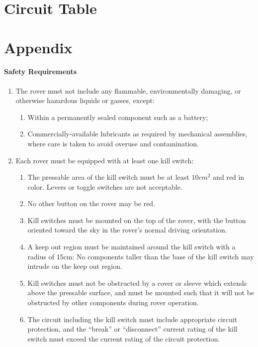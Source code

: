 \section{Circuit Table}

\section{Appendix}

\paragraph{Safety Requirements}

\begin{enumerate}
    \item The rover must not include any flammable, environmentally damaging, or otherwise hazardous liquids or gasses, except:
    \begin{enumerate}
        \item Within a permanently sealed component such as a battery; \label{test}
        \item Commercially-available lubricants as required by mechanical assemblies, where care is taken to avoid overuse and contamination.
    \end{enumerate}
    \item Each rover must be equipped with at least one kill switch:
    \begin{enumerate}
        \item The pressable area of the kill switch must be at least $10 cm^2$ and red in color. Levers or toggle switches are not acceptable.
        \item No other button on the rover may be red.
        \item Kill switches must be mounted on the top of the rover, with the button oriented toward the sky in the rover’s normal driving orientation.
        \item A keep out region must be maintained around the kill switch with a radius of 15cm: No components taller than the base of the kill switch may intrude on the keep out region.
        \item Kill switches must not be obstructed by a cover or sleeve which extends above the pressable surface, and must be mounted such that it will not be obstructed by other components during rover operation.
        \item The circuit including the kill switch must include appropriate circuit protection, and the “break” or “disconnect” current rating of the kill switch must exceed the current rating of the circuit protection.

\end{enumerate}
\end{enumerate}
